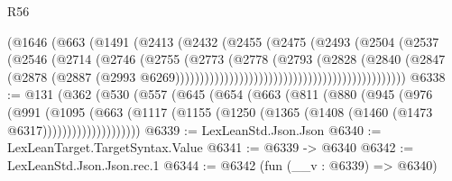\begin{lexlean}{R56}
\begin{coremodule}
{{{{{{{{{{{{{{{{{{{{{{{{{{{{{{{{{{{{{{{{{{{{{{{{{{{{{{{{{{{{{{{{{{{{{{{{{{{{{{{{{{{{{{{{{{{{{{{{{{{{{{{{{{{{{{{{{{{{{{{{{{{{{{{{{{{{{{{{{{{{{{{{{{{{{{{{{{{{{{{{{{{{{{{{{{{{{{{{{{{{{{{{{{{{{{{{{{{{{{{{{{{{{{{{{{{                                                    (@1646
                                                      (@663
                                                        (@1491
                                                          (@2413
                                                            (@2432
                                                              (@2455
                                                                (@2475
                                                                  (@2493
                                                                    (@2504
                                                                      (@2537
                                                                        (@2546
                                                                          (@2714
                                                                            (@2746
                                                                              (@2755
                                                                                (@2773
                                                                                  (@2778
                                                                                    (@2793
                                                                                      (@2828
                                                                                        (@2840
                                                                                          (@2847
                                                                                            (@2878
                                                                                              (@2887
                                                                                                (@2993
                                                                                                  @6269)))))))))))))))))))))))))))))))))))))))))))))))
@6338 := @131
    (@362
      (@530
        (@557
          (@645
            (@654
              (@663
                (@811
                  (@880
                    (@945
                      (@976
                        (@991
                          (@1095
                            (@663
                              (@1117
                                (@1155 (@1250 (@1365 (@1408 (@1460 (@1473 @6317))))))))))))))))))))
@6339 := LexLeanStd.Json.Json
@6340 := LexLeanTarget.TargetSyntax.Value
@6341 := @6339 -> @6340
@6342 := LexLeanStd.Json.Json.rec.{1}
@6344 := @6342 (fun (__v : @6339) => @6340)
}}}}}}}}}}}}}}}}}}}}}}}}}}}}}}}}}}}}}}}}}}}}}}}}}}}}}}}}}}}}}}}}}}}}}}}}}}}}}}}}}}}}}}}}}}}}}}}}}}}}}}}}}}}}}}}}}}}}}}}}}}}}}}}}}}}}}}}}}}}}}}}}}}}}}}}}}}}}}}}}}}}}}}}}}}}}}}}}}}}}}}}}}}}}}}}}}}}}}}}}}}}}}}}}}}}
\end{coremodule}
\end{lexlean}
